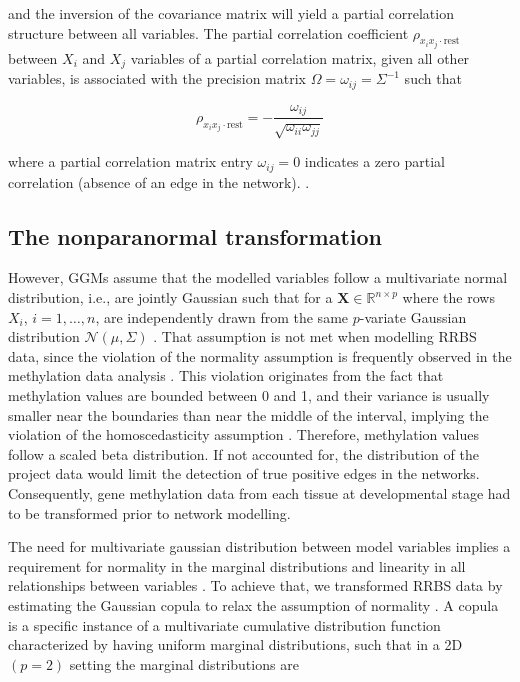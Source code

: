 \documentclass[
	a4paper, %
	10pt, %
	unnumberedsections, %
	twoside, %
]{LTJournalArticle}
\begin{document}
\noindent and the inversion of the covariance matrix will yield a 
partial correlation structure between all variables. 
The partial correlation coefficient $\rho_{x_i x_j \cdot \text{rest}}$ 
between $X_i$ and $X_j$ variables of a partial 
correlation matrix, given all other variables, is associated 
with the precision matrix $\Omega = \omega_{ij} = \Sigma^{-1}$ 
such that

\begin{equation} \label{eq:S7}
    \rho_{x_i x_j \cdot \text{rest}} = -\frac{\omega_{ij}}{\sqrt{\omega_{ii} \omega_{jj}}}
\end{equation}

\noindent where a partial correlation matrix entry $\omega_{ij} = 0$ indicates 
a zero partial correlation (absence of an edge in the network).
\autocite{altenbuchinger2020a}.

\subsection{\normalsize The nonparanormal transformation}
However, GGMs assume that the modelled variables 
follow a multivariate normal distribution, i.e., are jointly Gaussian such that 
for a $\mathbf{X} \in \mathsf{\mathbb{R}}^{n \times p}$ where the rows $X_i$, $i=1, \ldots, n$, 
are independently drawn from the same $p$-variate Gaussian distribution 
$\mathcal{N}(\mu, \Sigma)$ \autocite{li2020a}. That assumption is not met when modelling RRBS data, 
since the violation of the normality assumption is frequently observed in the 
methylation data analysis \autocite{li2018a}. This violation originates from the fact 
that methylation values are bounded between 0 and 1, and their variance is usually 
smaller near the boundaries than near the middle of the interval, 
implying the violation of the homoscedasticity assumption \autocite{weinhold2016a}. 
Therefore, methylation values follow a scaled beta distribution. 
If not accounted for, the distribution of the project data would limit the detection
of true positive edges in the networks. 
Consequently, gene methylation
data from each tissue at developmental stage had to be transformed prior to network modelling.\newline

The need for multivariate gaussian distribution between model variables implies a 
requirement for normality in the marginal distributions and 
linearity in all relationships between variables \autocite{epskamp2018a}. To achieve 
that, we transformed RRBS data by estimating the Gaussian copula to relax the 
assumption of normality \autocite{czado2022a}. A copula is a specific instance 
of a multivariate cumulative distribution function characterized by having 
uniform marginal distributions, 
such that in a 2D \((p=2)\) setting the marginal distributions are
\end{document}
